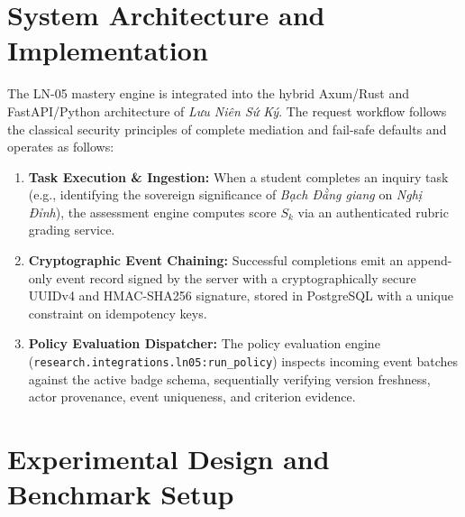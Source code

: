 \documentclass[11pt,a4paper]{article}
\begin{document}
\section{System Architecture and Implementation}

The LN-05 mastery engine is integrated into the hybrid Axum/Rust and FastAPI/Python architecture of \textit{Lưu Niên Sứ Ký}. The request workflow follows the classical security principles of complete mediation and fail-safe defaults \cite{saltzer1975protection} and operates as follows:
\begin{enumerate}
    \item \textbf{Task Execution \& Ingestion:} When a student completes an inquiry task (e.g., identifying the sovereign significance of \textit{Bạch Đằng giang} on \textit{Nghị Đỉnh}), the assessment engine computes score $S_k$ via an authenticated rubric grading service.
    \item \textbf{Cryptographic Event Chaining:} Successful completions emit an append-only event record signed by the server with a cryptographically secure UUIDv4 and HMAC-SHA256 signature, stored in PostgreSQL with a unique constraint on idempotency keys.
    \item \textbf{Policy Evaluation Dispatcher:} The policy evaluation engine (\texttt{research.integrations.ln05:run\_policy}) inspects incoming event batches against the active badge schema, sequentially verifying version freshness, actor provenance, event uniqueness, and criterion evidence.
\end{enumerate}

\section{Experimental Design and Benchmark Setup}
\end{document}
